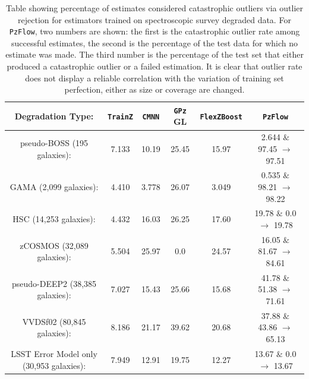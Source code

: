 \documentclass[fleqn,usenatbib,useAMS]{mnras}
\newcommand{\PersonalTag}[3]{{\color{#2}{$^{#1}$ [#3}]}}
\newcommand{\aim}[1]{\PersonalTag{Alex}{violet}{#1}}
\begin{document}
\begin{table}
\begin{center}
\begin{tabular}{||c c c c c c||} 
 \hline
 Degradation Type: & \texttt{TrainZ} & \texttt{CMNN} & \texttt{GPz} GL & \texttt{FlexZBoost} & \texttt{PzFlow}\\ [0.5ex] 
 \hline\hline
 pseudo-BOSS (195 galaxies): & 7.133 & 10.19 & 25.45 & 15.97  & 2.644 $\&$ 97.45 $\rightarrow$ 97.51\\
 \hline
 GAMA (2,099 galaxies): & 4.410 & 3.778 & 26.07 &  3.049 & 0.535 $\&$ 98.21 $\rightarrow$ 98.22\\
 \hline
 HSC (14,253 galaxies): & 4.432 & 16.03 & 26.25 & 17.60 & 19.78 $\&$ 0.0 $\rightarrow$ 19.78\\  
 \hline
 zCOSMOS (32,089 galaxies): & 5.504 & 25.97 & 0.0 & 24.57 & 16.05 $\&$ 81.67 $\rightarrow$ 84.61\\  
 \hline
 pseudo-DEEP2 (38,385 galaxies): & 7.027 & 15.43 & 25.66 & 15.68 & 41.78 $\&$ 51.38 $\rightarrow$ 71.61\\
 \hline
 VVDSf02 (80,845 galaxies): & 8.186 & 21.17 & 39.62 & 20.68 & 37.88 $\&$ 43.86 $\rightarrow$ 65.13\\
 \hline\hline
 LSST Error Model only (30,953 galaxies): & 7.949 & 12.91 & 19.75 & 12.27 & 13.67 $\&$ 0.0 $\rightarrow$ 13.67\\ [1ex] 
 \hline
\end{tabular}
\caption{Table showing percentage of estimates considered catastrophic outliers via outlier rejection for estimators trained on spectroscopic survey degraded data. For \texttt{PzFlow}, two numbers are shown: the first is the catastrophic outlier rate among successful estimates, the second is the percentage of the test data for which no estimate was made. The third number is the percentage of the test set that either produced a catastrophic outlier or a failed estimation. It is clear that outlier rate does not display a reliable correlation with the variation of training set perfection, either as size or coverage are changed. }
\label{tab:spec rej} 
\end{center}
\end{table}
\end{document}
